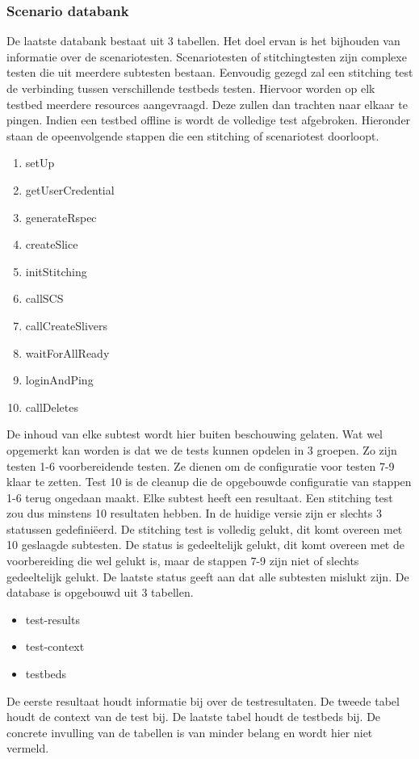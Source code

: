 \subsubsection{Scenario databank}
\npar
De laatste databank bestaat uit 3 tabellen. Het doel ervan is het bijhouden van informatie over de scenariotesten. Scenariotesten of stitchingtesten zijn complexe testen die uit meerdere subtesten bestaan. Eenvoudig gezegd zal een stitching test de verbinding tussen verschillende testbeds testen. Hiervoor worden op elk testbed meerdere resources aangevraagd. Deze zullen dan trachten naar elkaar te pingen. Indien een testbed offline is wordt de volledige test afgebroken. Hieronder staan de opeenvolgende stappen die een stitching of scenariotest doorloopt.
\begin{enumerate}
\item setUp
\item getUserCredential
\item generateRspec
\item createSlice
\item initStitching
\item callSCS
\item callCreateSlivers
\item waitForAllReady
\item loginAndPing
\item callDeletes
\end{enumerate}
De inhoud van elke subtest wordt hier buiten beschouwing gelaten.
Wat wel opgemerkt kan worden is dat we de tests kunnen opdelen in 3 groepen. Zo zijn testen 1-6 voorbereidende testen. Ze dienen om de configuratie voor testen 7-9 klaar te zetten. Test 10 is de cleanup die de opgebouwde configuratie van stappen 1-6 terug ongedaan maakt.
Elke subtest heeft een resultaat. Een stitching test zou dus minstens 10 resultaten hebben. In de huidige versie zijn er slechts 3 statussen gedefini\"eerd. De stitching test is volledig gelukt, dit komt overeen met 10 geslaagde subtesten. De status is gedeeltelijk gelukt, dit komt overeen met de voorbereiding die wel gelukt is, maar de stappen 7-9 zijn niet of slechts gedeeltelijk gelukt. De laatste status geeft aan dat alle subtesten mislukt zijn.
\npar
De database is opgebouwd uit 3 tabellen.
\begin{itemize}
\item test-results
\item test-context
\item testbeds
\end{itemize}
De eerste resultaat houdt informatie bij over de testresultaten. De tweede tabel houdt de context van de test bij. De laatste tabel houdt de testbeds bij. De concrete invulling van de tabellen is van minder belang en wordt hier niet vermeld.
\clearpage
